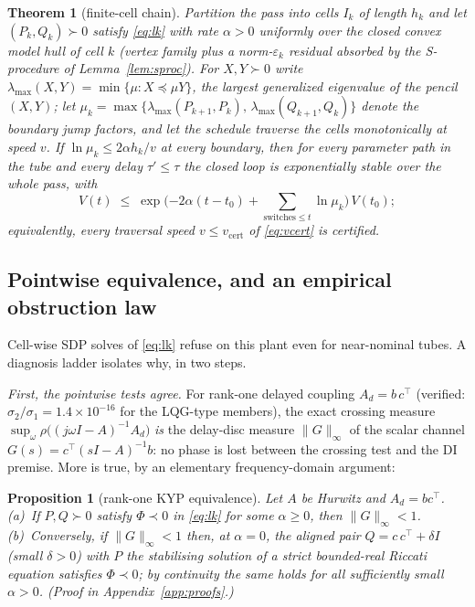 \documentclass[preprint,12pt]{elsarticle}
\newtheorem{theorem}{Theorem}
\newtheorem{proposition}{Proposition}
\newcommand{\vcert}{v_{\mathrm{cert}}}
\begin{document}
\begin{theorem}[finite-cell chain]\label{thm:chain}
Partition the pass into cells $I_k$ of length $h_k$ and let
$(P_k, Q_k) \succ 0$ satisfy \eqref{eq:lk} with rate $\alpha > 0$
uniformly over the closed convex model hull of cell $k$ (vertex family
plus a norm-$\varepsilon_k$ residual absorbed by the S-procedure of
Lemma~\ref{lem:sproc}).  For $X, Y \succ 0$ write
$\lambda_{\max}(X, Y) = \min\{\mu : X \preceq \mu Y\}$, the largest
generalized eigenvalue of the pencil $(X, Y)$; let
$\mu_k = \max\{\lambda_{\max}(P_{k+1}, P_k),\,
\lambda_{\max}(Q_{k+1}, Q_k)\}$ denote the boundary jump factors, and
let the schedule traverse the cells monotonically at speed $v$.  If
$\ln \mu_k \le 2\alpha h_k / v$ at every boundary, then for every
parameter path in the tube and every delay $\tau' \le \tau$ the closed
loop is exponentially stable over the whole pass, with
\[
V(t) \;\le\; \exp\Big({-2\alpha (t - t_0)} +
\textstyle\sum_{\text{switches}\le t} \ln \mu_k\Big)\, V(t_0);
\]
equivalently, every traversal speed $v \le \vcert$ of
\eqref{eq:vcert} is certified.
\end{theorem}

\subsection{Pointwise equivalence, and an empirical obstruction law}

Cell-wise SDP solves of \eqref{eq:lk} refuse on this plant even for
near-nominal tubes.  A diagnosis ladder isolates why, in two steps.

\emph{First, the pointwise tests agree.}  For rank-one delayed coupling
$A_d = b\,c^{\!\top}$ (verified: $\sigma_2/\sigma_1 = 1.4\times
10^{-16}$ for the LQG-type members), the exact crossing measure
$\sup_\omega \rho\!\big((j\omega I - A)^{-1} A_d\big)$ \emph{is} the
delay-disc measure $\|G\|_\infty$ of the scalar channel
$G(s) = c^{\!\top}(sI - A)^{-1} b$: no phase is lost between the
crossing test and the DI premise.  More is true, by an elementary
frequency-domain argument:

\begin{proposition}[rank-one KYP equivalence]\label{prop:kyp}
Let $A$ be Hurwitz and $A_d = b c^{\!\top}$.
(a)~If $P, Q \succ 0$ satisfy $\Phi \prec 0$ in \eqref{eq:lk} for some
$\alpha \ge 0$, then $\|G\|_\infty < 1$.
(b)~Conversely, if $\|G\|_\infty < 1$ then, at $\alpha = 0$, the
aligned pair $Q = c\,c^{\!\top} + \delta I$ (small $\delta > 0$) with
$P$ the stabilising solution of a strict bounded-real Riccati equation
satisfies $\Phi \prec 0$; by continuity the same holds for all
sufficiently small $\alpha > 0$.
(Proof in Appendix~\ref{app:proofs}.)
\end{proposition}
\end{document}
